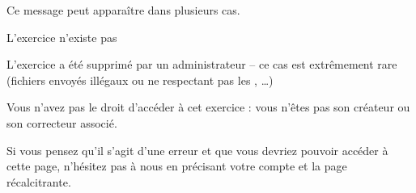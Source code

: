 ﻿Ce message peut apparaître dans plusieurs cas.
\item L'exercice n'existe pas
\item L'exercice a été supprimé par un administrateur -- ce cas est extrêmement rare (fichiers envoyés illégaux ou ne respectant pas les , …)
\item Vous n'avez pas le droit d'accéder à cet exercice : vous n'êtes pas son créateur ou son correcteur associé.

Si vous pensez qu'il s'agit d'une erreur et que vous devriez pouvoir accéder à cette page, n'hésitez pas à nous  en précisant votre compte et la page récalcitrante.